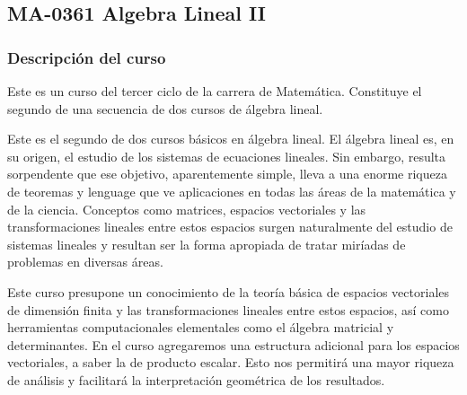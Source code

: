 \newpage
\subsection*{MA-0361 Algebra Lineal II}

\begin{refsection}
\begin{table}[H]
\end{table}



\subsubsection*{Descripción del curso}

Este es un curso del tercer ciclo de la carrera de Matemática. Constituye el segundo de una secuencia de dos cursos de álgebra lineal. 

Este es el segundo de dos cursos b\'asicos en \'algebra lineal. El \'algebra lineal es,
en su origen, el estudio de los sistemas de ecuaciones lineales. Sin embargo, resulta
sorpendente que ese objetivo, aparentemente simple, lleva a una enorme riqueza de
teoremas y lenguage que ve aplicaciones en todas las \'areas de la matem\'atica y de la
ciencia. Conceptos como matrices, espacios vectoriales y las transformaciones lineales
entre estos espacios surgen naturalmente del estudio de sistemas lineales y resultan ser
la forma apropiada de tratar mir\'iadas de problemas en diversas \'areas.

Este curso presupone un conocimiento de la teor\'ia b\'asica de espacios vectoriales
de dimensi\'on finita y las transformaciones lineales entre estos espacios, as\'i como herramientas
computacionales elementales como el \'algebra matricial y determinantes. En
el curso agregaremos una estructura adicional para los espacios vectoriales, a saber la
de producto escalar. Esto nos permitir\'a una mayor riqueza de an\'alisis y facilitar\'a la
interpretaci\'on geom\'etrica de los resultados. 


\end{refsection}
